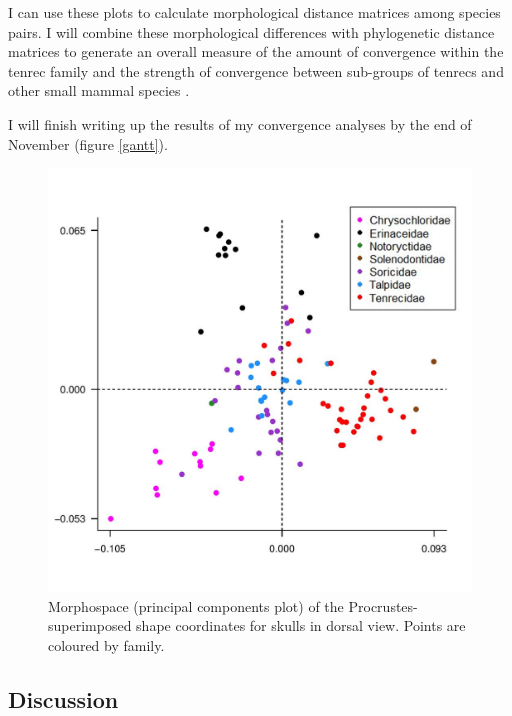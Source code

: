 \documentclass[12pt,a4paper]{article}
\begin{document}
	I can use these plots to calculate morphological distance matrices among species pairs. I will combine these morphological differences with phylogenetic distance matrices to generate an overall measure of the amount of convergence within the tenrec family \citep{Stayton2008} and the strength of convergence between sub-groups of tenrecs and other small mammal species \citep{Arbuckle2014}.

	I will finish writing up the results of my convergence analyses by the end of November (figure \ref{gantt}).

	

  \begin{figure}[!htb]
	\centering
	\includegraphics[width=\textwidth, height=\textheight, keepaspectratio=true]{skdors_allfam_PCA_legend.png}
		\caption{Morphospace (principal components plot) of the 		Procrustes-superimposed shape coordinates for skulls in dorsal view. Points are coloured by family.}
	\label{fig:skdors_pca}
  \end{figure}

	

\subsection{Discussion}
\end{document}
